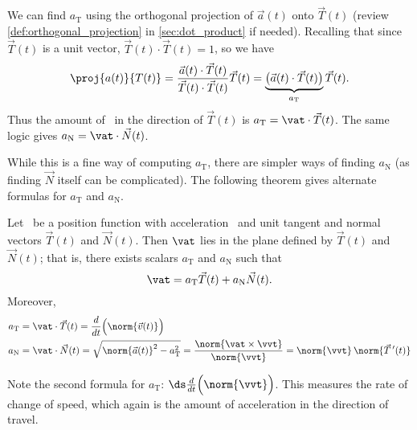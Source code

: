 We can find $a_{\text{T}}$ using the orthogonal projection of $\vec a(t)$ onto $\vec T(t)$ (review \autoref{def:orthogonal_projection} in \autoref{sec:dot_product} if needed).
Recalling that since $\vec T(t)$ is a unit vector, $\vec T(t)\cdot\vec T(t)=1$, so we have 
\[\proj{a(t)}{T(t)} = \frac{\vec a(t)\cdot\vec T(t)}{\vec T(t)\cdot\vec T(t)}\vec T(t) = \underbrace{\big(\vec a(t)\cdot\vec T(t)\big)}_{a_{\text{T}}}\vec T(t).\]
Thus the amount of \vat\ in the direction of $\vec T(t)$ is $a_{\text{T}}=\vat\cdot\vec T(t)$. The same logic gives $a_{\text{N}} = \vat\cdot\vec N(t)$.

While this is a fine way of computing $a_{\text{T}}$, there are simpler ways of finding $a_{\text{N}}$ (as finding $\vec N$ itself can be complicated). The following theorem gives alternate formulas for $a_{\text{T}}$ and $a_{\text{N}}$.

\setboxwidth{20pt}
{Let \vrt\ be a position function with acceleration \vat\ and unit tangent and normal vectors $\vec T(t)$ and $\vec N(t)$. Then $\vat$ lies in the plane defined by $\vec T(t)$ and $\vec N(t)$; that is, there exists scalars $a_\text{T}$ and $a_\text{N}$ such that
\[\vat = a_\text{T}\vec T(t) + a_\text{N}\vec N(t).\]
Moreover,
\begin{align*}
a_\text{T} &= \vat\cdot\vec T(t) = \frac{d}{dt}\Big(\norm{\vec v(t)}\Big) \\
a_\text{N} &= \vat\cdot \vec N(t) = \sqrt{\norm{\vec a(t)}^2-a_\text{T}^2} = \frac{\norm{\vat\times\vvt}}{\norm{\vvt}} = \norm{\vvt}\,\norm{\vec T\,'(t)}
\end{align*}%
}

Note the second formula for $a_\text{T}$: $\ds \frac{d}{dt}\Big(\norm{\vvt}\Big)$. This measures the rate of change of speed, which again is the amount of acceleration in the direction of travel.

